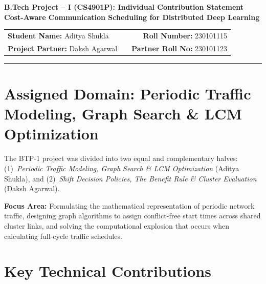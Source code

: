 \documentclass[11pt,a4paper]{article}
\begin{document}
\begin{center}
    {\Large\bfseries\color{primaryblue} B.Tech Project -- I (CS4901P): Individual Contribution Statement}\\[3pt]
    {\large\textbf{Cost-Aware Communication Scheduling for Distributed Deep Learning}}
\end{center}

\vspace{-4pt}
\begin{center}
\begin{tabularx}{\textwidth}{@{}lXr@{}}
    \textbf{Student Name:} Aditya Shukla & & \textbf{Roll Number:} 230101115 \\
    \textbf{Project Partner:} Daksh Agarwal & & \textbf{Partner Roll No:} 230101123
\end{tabularx}
\end{center}
\vspace{-6pt}
\hrule
\vspace{4pt}

\section*{Assigned Domain: Periodic Traffic Modeling, Graph Search \& LCM Optimization}
The BTP-1 project was divided into two equal and complementary halves: (1)~\emph{Periodic Traffic Modeling, Graph Search \& LCM Optimization} (Aditya Shukla), and (2)~\emph{Shift Decision Policies, The Benefit Rule \& Cluster Evaluation} (Daksh Agarwal). 

\vspace{2pt}
\noindent
\textbf{Focus Area:} Formulating the mathematical representation of periodic network traffic, designing graph algorithms to assign conflict-free start times across shared cluster links, and solving the computational explosion that occurs when calculating full-cycle traffic schedules.

\section*{Key Technical Contributions}
\end{document}
